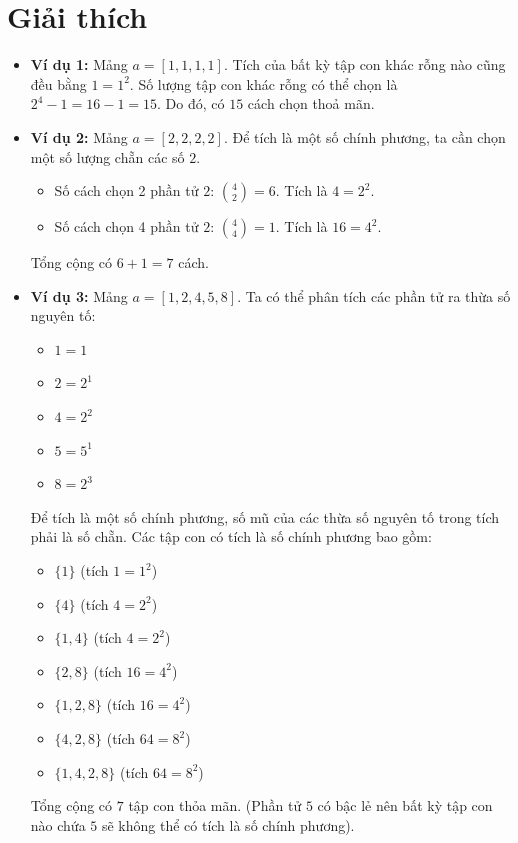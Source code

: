 \documentclass[12pt,a4paper]{article}
\begin{document}
\section*{Giải thích}
\begin{itemize}
    \item \textbf{Ví dụ 1:} Mảng $a = [1, 1, 1, 1]$. Tích của bất kỳ tập con khác rỗng nào cũng đều bằng $1 = 1^2$.
Số lượng tập con khác rỗng có thể chọn là $2^4 - 1 = 16 - 1 = 15$.
Do đó, có $15$ cách chọn thoả mãn.

    \item \textbf{Ví dụ 2:} Mảng $a = [2, 2, 2, 2]$. Để tích là một số chính phương, ta cần chọn một số lượng chẵn các số $2$.
    \begin{itemize}
        \item Số cách chọn 2 phần tử $2$: $\binom{4}{2} = 6$. Tích là $4 = 2^2$.
        \item Số cách chọn 4 phần tử $2$: $\binom{4}{4} = 1$. Tích là $16 = 4^2$.
    \end{itemize}
    Tổng cộng có $6 + 1 = 7$ cách.

    \item \textbf{Ví dụ 3:} Mảng $a = [1, 2, 4, 5, 8]$. Ta có thể phân tích các phần tử ra thừa số nguyên tố:
    \begin{itemize}
        \item $1 = 1$
        \item $2 = 2^1$
        \item $4 = 2^2$
        \item $5 = 5^1$
        \item $8 = 2^3$
    \end{itemize}
    Để tích là một số chính phương, số mũ của các thừa số nguyên tố trong tích phải là số chẵn.
    Các tập con có tích là số chính phương bao gồm:
    \begin{itemize}
        \item $\{1\}$ (tích $1 = 1^2$)
        \item $\{4\}$ (tích $4 = 2^2$)
        \item $\{1, 4\}$ (tích $4 = 2^2$)
        \item $\{2, 8\}$ (tích $16 = 4^2$)
        \item $\{1, 2, 8\}$ (tích $16 = 4^2$)
        \item $\{4, 2, 8\}$ (tích $64 = 8^2$)
        \item $\{1, 4, 2, 8\}$ (tích $64 = 8^2$)
    \end{itemize}
    Tổng cộng có $7$ tập con thỏa mãn. (Phần tử $5$ có bậc lẻ nên bất kỳ tập con nào chứa $5$ sẽ không thể có tích là số chính phương).
\end{itemize}
\end{document}
